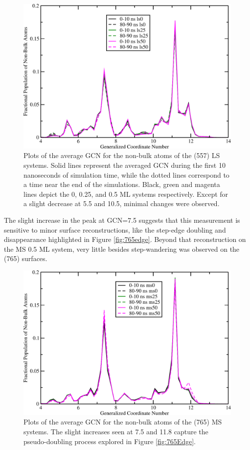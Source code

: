 \begin{figure}
\centering
\includegraphics[width=\linewidth]{../figures/appB/557ls_GCNF.pdf}
\caption{Plots of the average GCN for the non-bulk atoms of the  (557)
LS systems. Solid lines represent the averaged GCN during the first 10
nanoseconds of simulation time, while the dotted lines correspond to a time
near the end of the simulations. Black, green and magenta lines depict the 0,
0.25, and 0.5 ML systems respectively. Except for a slight decrease at 5.5 and
10.5, minimal changes were observed.}
\label{fig:557lsGCN}
\end{figure}
\newpage


The slight increase in the peak at GCN=7.5 suggests that this measurement is
sensitive to minor surface reconstructions, like the step-edge doubling and
disappearance highlighted in Figure \ref{fig:765edge}. Beyond that
reconstruction on the MS 0.5 ML system, very little besides step-wandering was
observed on the (765) surfaces.

\begin{figure}
\centering
\includegraphics[width=\linewidth]{../figures/appB/765ms_GCNF.pdf}
\caption{Plots of the average GCN for the non-bulk atoms of the  (765)
MS systems. The slight increases seen at 7.5 and 11.8 capture the
pseudo-doubling process explored in Figure \ref{fig:765Edge}.}
\label{fig:765msGCN}
\end{figure}
\newpage

